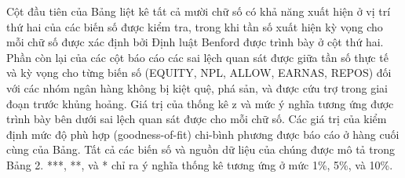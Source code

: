 Cột đầu tiên của Bảng liệt kê tất cả mười chữ số có khả năng xuất hiện ở vị trí thứ hai của các biến số được kiểm tra, trong khi tần số xuất hiện kỳ vọng cho mỗi chữ số được xác định bởi Định luật Benford được trình bày ở cột thứ hai. Phần còn lại của các cột báo cáo các sai lệch quan sát được giữa tần số thực tế và kỳ vọng cho từng biến số (EQUITY, NPL, ALLOW, EARNAS, REPOS) đối với các nhóm ngân hàng không bị kiệt quệ, phá sản, và được cứu trợ trong giai đoạn trước khủng hoảng. Giá trị của thống kê z và mức ý nghĩa tương ứng được trình bày bên dưới sai lệch quan sát được cho mỗi chữ số. Các giá trị của kiểm định mức độ phù hợp (goodness-of-fit) chi-bình phương được báo cáo ở hàng cuối cùng của Bảng. Tất cả các biến số và nguồn dữ liệu của chúng được mô tả trong Bảng 2. ***, **, và * chỉ ra ý nghĩa thống kê tương ứng ở mức 1\%, 5\%, và 10\%.


